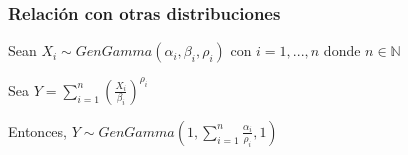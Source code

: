 \begin{frame}
    \frametitle{Relación con otras distribuciones}

    Sean $X_i \sim GenGamma(\alpha_i, \beta_i, \rho_i)$ con $i=1,...,n$ donde $n \in \mathbb{N}$

    \vspace{0.5cm}

    Sea $Y = \sum_{i=1}^{n} (\frac{X_i}{\beta_i})^{\rho_i}$

    \vspace{0.5cm}

    Entonces, $Y \sim GenGamma(1, \sum_{i=1}^{n} \frac{\alpha_i}{\rho_i} , 1)$

    \cite{theory1}
\end{frame}
